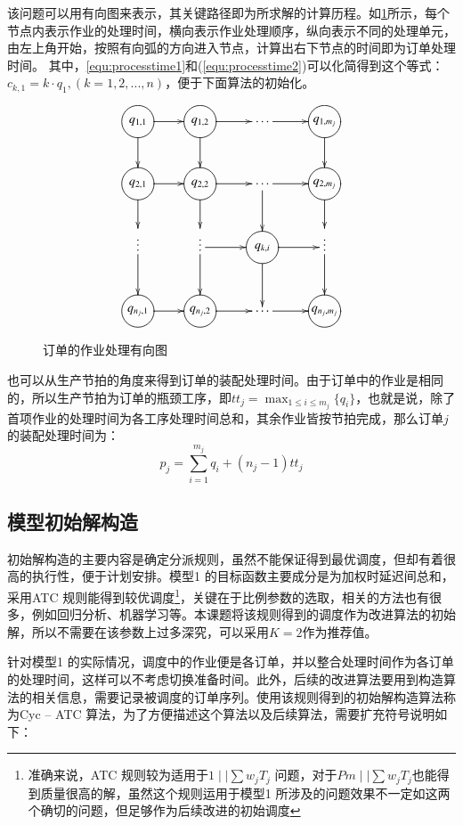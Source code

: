 该问题可以用有向图来表示，其关键路径即为所求解的计算历程。如\ref{fig:directedgraph}所示，每个节点内表示作业的处理时间，横向表示作业处理顺序，纵向表示不同的处理单元，由左上角开始，按照有向弧的方向进入节点，计算出右下节点的时间即为订单处理时间。
其中，\eqref{equ:processtime1}和(\ref{equ:processtime2})可以化简得到这个等式：$c_{k,1} = k\cdot q_1,(k = 1,2,...,n)$，便于下面算法的初始化。
\begin{figure}[h]
\begin{equation*}
\xymatrix{
\process{q_{1,1}} \ar[r] \ar[d] & \process{q_{1,2}} \ar[d] \ar[r] & \cdots\ar[r] & \process{q_{1,m_j}} \ar[d]\\
\process{q_{2,1}} \ar[r]\ar[d] & \process{q_{2,2}} \ar[d]\ar[r] & \cdots \ar[r] \ar[d]& \process{q_{2,m_j}} \ar[d] \\
\vdots\ar[d] & \vdots \ar[d]\ar[r] & \process{q_{k,i}}\ar[r]\ar[d] &\vdots \ar[d]\\
\process{q_{n_j,1}} \ar[r] & \process{q_{n_j,2}} \ar[r] & \cdots\ar[r] & \process{q_{n_j,m_j}}
}
\end{equation*}
\caption{订单的作业处理有向图\label{fig:directedgraph}}
\end{figure}

也可以从生产节拍的角度来得到订单的装配处理时间。由于订单中的作业是相同的，所以生产节拍为订单的瓶颈工序，即$\displaystyle tt_j = \max_{1\le i\le m_j}\{q_i\}$，也就是说，除了首项作业的处理时间为各工序处理时间总和，其余作业皆按节拍完成，那么订单$j$的装配处理时间为：
\begin{equation}
p_j = \sum_{i = 1}^{m_j}q_i + (n_j - 1)tt_j
\label{equ:processtime}
\end{equation}

\subsection{模型初始解构造}
初始解构造的主要内容是确定分派规则，虽然不能保证得到最优调度，但却有着很高的执行性，便于计划安排。模型1 的目标函数主要成分是为加权时延迟间总和，采用ATC 规则能得到较优调度\footnote{准确来说，ATC 规则较为适用于$1\mid\mid \sum w_jT_j$ 问题，对于$Pm\mid\mid \sum w_jT_j$也能得到质量很高的解，虽然这个规则运用于模型1 所涉及的问题效果不一定如这两个确切的问题，但足够作为后续改进的初始调度}，关键在于比例参数的选取，相关的方法也有很多，例如回归分析、机器学习等。本课题将该规则得到的调度作为改进算法的初始解，所以不需要在该参数上过多深究，可以采用$K = 2$作为推荐值\cite{bilge2007tabu}。

针对模型1 的实际情况，调度中的作业便是各订单，并以整合处理时间作为各订单的处理时间，这样可以不考虑切换准备时间。此外，后续的改进算法要用到构造算法的相关信息，需要记录被调度的订单序列。使用该规则得到的初始解构造算法称为Cyc -- ATC 算法，为了方便描述这个算法以及后续算法，需要扩充符号说明如下：

